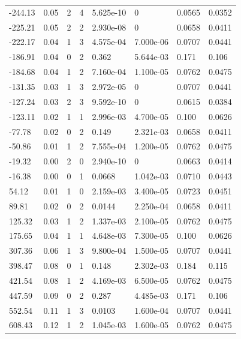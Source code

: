 \documentclass[preview]{standalone}
\begin{document}
{{\begin{tabular}{L{1.2cm}C{1.2cm} C{0.3cm}C{0.5cm} C{1.4cm}C{1.4cm} C{1.4cm}C{1.4cm}}
  -244.13  &  0.05  & 2     &  4 &  5.625e-10  & 0  & 0.0565 &  0.0352   \\ 
  -225.21  &  0.05  & 2     &  2 &  2.930e-08  & 0  & 0.0658 &  0.0411   \\ 
  -222.17  &  0.04  & 1     &  3 &  4.575e-04  & 7.000e-06  & 0.0707 &  0.0441   \\ 
  -186.91  &  0.04  & 0     &  2 &  0.362  & 5.644e-03  & 0.171 &  0.106   \\ 
  -184.68  &  0.04  & 1     &  2 &  7.160e-04  & 1.100e-05  & 0.0762 &  0.0475   \\ 
  -131.35  &  0.03  & 1     &  3 &  2.972e-05  & 0  & 0.0707 &  0.0441   \\ 
  -127.24  &  0.03  & 2     &  3 &  9.592e-10  & 0  & 0.0615 &  0.0384   \\ 
  -123.11  &  0.02  & 1     &  1 &  2.996e-03  & 4.700e-05  & 0.100 &  0.0626   \\ 
  -77.78  &  0.02  & 0     &  2 &  0.149  & 2.321e-03  & 0.0658 &  0.0411   \\ 
  -50.86  &  0.01  & 1     &  2 &  7.555e-04  & 1.200e-05  & 0.0762 &  0.0475   \\ 
  -19.32  &  0.00  & 2     &  0 &  2.940e-10  & 0  & 0.0663 &  0.0414   \\ 
  -16.38  &  0.00  & 0     &  1 &  0.0668  & 1.042e-03  & 0.0710 &  0.0443   \\ 
  54.12  &  0.01  & 1     &  0 &  2.159e-03  & 3.400e-05  & 0.0723 &  0.0451   \\ 
  89.81  &  0.02  & 0     &  2 &  0.0144  & 2.250e-04  & 0.0658 &  0.0411   \\ 
  125.32  &  0.03  & 1     &  2 &  1.337e-03  & 2.100e-05  & 0.0762 &  0.0475   \\ 
  175.65  &  0.04  & 1     &  1 &  4.648e-03  & 7.300e-05  & 0.100 &  0.0626   \\ 
  307.36  &  0.06  & 1     &  3 &  9.800e-04  & 1.500e-05  & 0.0707 &  0.0441   \\ 
  398.47  &  0.08  & 0     &  1 &  0.148  & 2.302e-03  & 0.184 &  0.115   \\ 
  421.54  &  0.08  & 1     &  2 &  4.169e-03  & 6.500e-05  & 0.0762 &  0.0475   \\ 
  447.59  &  0.09  & 0     &  2 &  0.287  & 4.485e-03  & 0.171 &  0.106   \\ 
  552.54  &  0.11  & 1     &  3 &  0.0103  & 1.600e-04  & 0.0707 &  0.0441   \\ 
  608.43  &  0.12  & 1     &  2 &  1.045e-03  & 1.600e-05  & 0.0762 &  0.0475   \\ 

\end{tabular}}}
\end{document}
